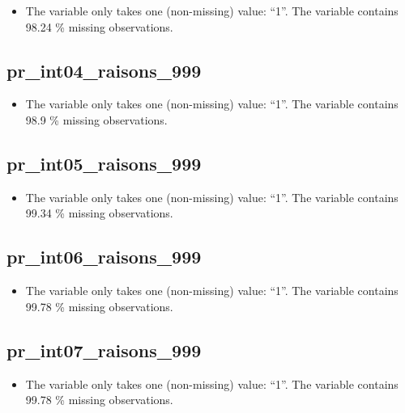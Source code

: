 \documentclass[
  letterpaper,
  DIV=11,
  numbers=noendperiod]{scrartcl}
\providecommand{\tightlist}{%
  \setlength{\itemsep}{0pt}\setlength{\parskip}{0pt}}
\begin{document}
\begin{itemize}
\tightlist
\item
  The variable only takes one (non-missing) value: ``1''. The variable
  contains 98.24 \% missing observations.
\end{itemize}

\fullline

\subsection{pr\_int04\_raisons\_999}\label{pr_int04_raisons_999}

\begin{itemize}
\tightlist
\item
  The variable only takes one (non-missing) value: ``1''. The variable
  contains 98.9 \% missing observations.
\end{itemize}

\fullline

\subsection{pr\_int05\_raisons\_999}\label{pr_int05_raisons_999}

\begin{itemize}
\tightlist
\item
  The variable only takes one (non-missing) value: ``1''. The variable
  contains 99.34 \% missing observations.
\end{itemize}

\fullline

\subsection{pr\_int06\_raisons\_999}\label{pr_int06_raisons_999}

\begin{itemize}
\tightlist
\item
  The variable only takes one (non-missing) value: ``1''. The variable
  contains 99.78 \% missing observations.
\end{itemize}

\fullline

\subsection{pr\_int07\_raisons\_999}\label{pr_int07_raisons_999}

\begin{itemize}
\tightlist
\item
  The variable only takes one (non-missing) value: ``1''. The variable
  contains 99.78 \% missing observations.
\end{itemize}
\end{document}
